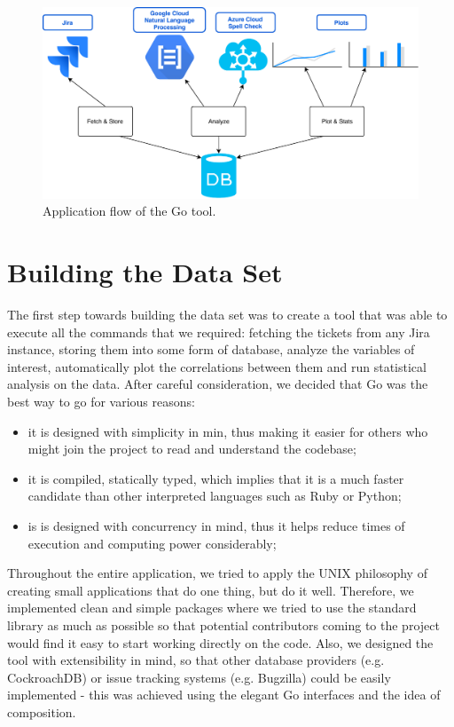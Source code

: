 \documentclass{mpaper}
\begin{document}
\begin{figure}
\begin{center}
\includegraphics[width=\textwidth]{images/flow.pdf}
\end{center}
\caption{\label{fig-eg}Application flow of the Go tool.}
\end{figure}

\section{Building the Data Set}\label{building}
The first step towards building the data set was to create a tool that was able to execute all the commands that we required:
fetching the tickets from any Jira instance, storing them into some form of database, analyze the variables of interest, 
automatically plot the correlations between them and run statistical analysis on the data. After careful consideration, 
we decided that Go was the best way to go for various reasons:
  \begin{itemize}
    \item it is designed with simplicity in min, thus making it easier for others who might join the project to read 
    and understand the codebase;
    \item it is compiled, statically typed, which implies that it is a much faster candidate than other interpreted languages
    such as Ruby or Python;
    \item is is designed with concurrency in mind, thus it helps reduce times of execution and computing power considerably;
  \end{itemize}

Throughout the entire application, we tried to apply the UNIX philosophy of creating small applications that do one thing, but 
do it well. Therefore, we implemented clean and simple packages where we tried to use the standard library as much as possible
so that potential contributors coming to the project would find it easy to start working directly on the code. Also, we designed 
the tool with extensibility in mind, so that other database providers (e.g. CockroachDB) or issue tracking systems (e.g. Bugzilla) 
could be easily implemented - this was achieved using the elegant Go interfaces and the idea of composition.  
\end{document}
